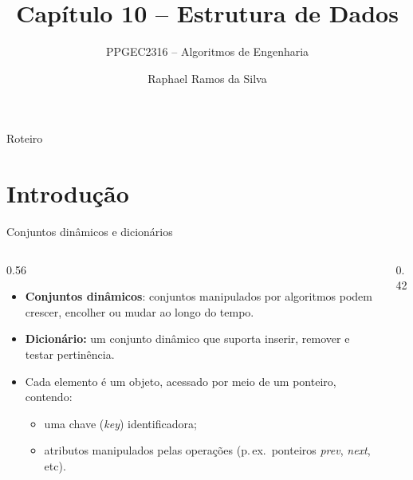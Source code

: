 \documentclass[aspectratio=169,10pt]{beamer}
\title[Cap. 10 -- Estrutura de Dados]{Capítulo 10 -- Estrutura de Dados}
\subtitle{PPGEC2316 -- Algoritmos de Engenharia}
\author{Raphael Ramos da Silva}
\institute[UFRN]{Universidade Federal do Rio Grande do Norte}
\date{}
\newcommand{\at}[1]{.\mathit{#1}}
\begin{document}
\begin{frame}
  \titlepage
\end{frame}

\begin{frame}{Roteiro}
  \tableofcontents
\end{frame}

\section{Introdução}

\begin{frame}{Conjuntos dinâmicos e dicionários}
  \begin{columns}[c]
    \begin{column}{0.56\textwidth}
      \begin{itemize}
        \item \textbf{Conjuntos dinâmicos}: conjuntos manipulados por algoritmos podem crescer, encolher ou
              mudar ao longo do tempo.
        \item \textbf{Dicionário:} um conjunto dinâmico que suporta inserir, remover e testar
              pertinência.
        \item Cada elemento é um \alert{objeto}, acessado por meio de um ponteiro, contendo:
          \begin{itemize}
            \item uma \alert{chave} (\textit{key}) identificadora;
            \item atributos manipulados pelas operações (p.\,ex.\ ponteiros \textit{prev}, \textit{next}, etc).
          \end{itemize}
      \end{itemize}
    \end{column}
    \begin{column}{0.42\textwidth}
      \centering
    \end{column}
  \end{columns}
\end{frame}
\end{document}
